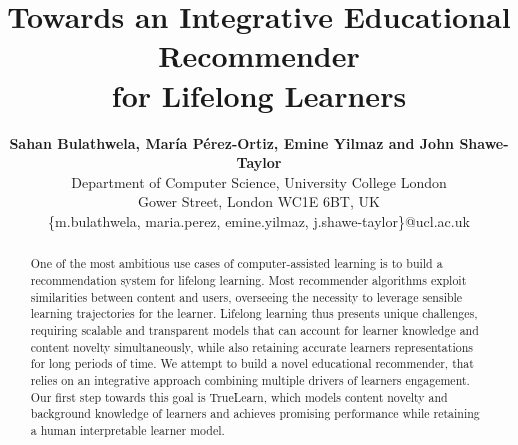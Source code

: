 \documentclass[letterpaper]{article} %
\title{Towards an Integrative Educational Recommender \\ for Lifelong Learners
}
\author{
\Large \textbf{Sahan Bulathwela, Mar\'ia P\'erez-Ortiz, Emine Yilmaz and John Shawe-Taylor}\\ %
Department of Computer Science, University College London \\
Gower Street, London WC1E 6BT, UK\\ %
\{m.bulathwela, maria.perez, emine.yilmaz, j.shawe-taylor\}@ucl.ac.uk  %
}
\begin{document}
 \maketitle

\begin{abstract}

One of the most ambitious use cases of computer-assisted learning is to build a recommendation system for lifelong learning. Most recommender algorithms exploit similarities between content and users, overseeing the necessity to leverage sensible learning trajectories for the learner. Lifelong learning thus presents unique challenges, requiring scalable and transparent models that can account for learner knowledge and content novelty simultaneously, while also retaining accurate learners representations for long periods of time. We attempt to build a novel educational recommender, that relies on an integrative approach combining multiple drivers of learners engagement. Our first step towards this goal is TrueLearn, which models content novelty and background knowledge of learners and achieves promising performance while retaining a human interpretable learner model.


\end{abstract}
\end{document}
